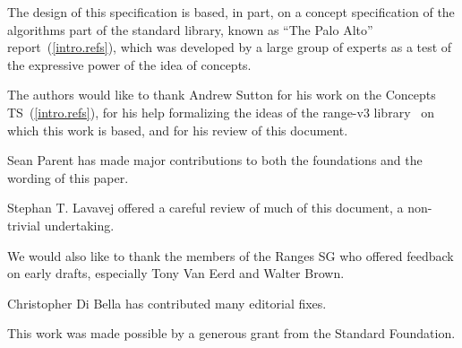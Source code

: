 
The design of this specification is based, in part, on a concept
specification of the algorithms part of the \Cpp standard library, known
as ``The Palo Alto'' report~(\ref{intro.refs}), which was developed by a large
group of experts as a test of the expressive power of the idea of
concepts.

The authors would like to thank Andrew Sutton for his work on the Concepts TS~(\ref{intro.refs}),
for his help formalizing the ideas of the range-v3 library~\cite{range-v3} on which this
work is based, and for his review of this document.

Sean Parent has made major contributions to both the foundations and the wording of this
paper.

Stephan T. Lavavej offered a careful review of much of this document, a non-trivial undertaking.

We would also like to thank the members of the Ranges SG who offered feedback on early drafts,
especially Tony Van Eerd and Walter Brown.

Christopher Di Bella has contributed many editorial fixes.

This work was made possible by a generous grant from the Standard \Cpp Foundation.
